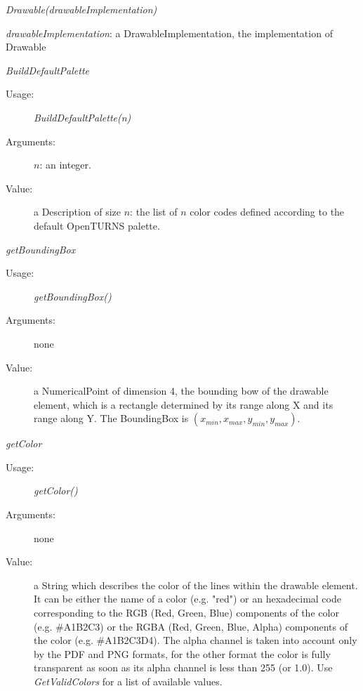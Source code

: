 \begin{description}
\item[Usage:] \textit{Drawable(drawableImplementation)}

\item[Arguments:] \textit{drawableImplementation}: a DrawableImplementation, the implementation of  Drawable

\item[Some methods:]  \rule{0pt}{1em}
  \begin{description}


  \item \textit{BuildDefaultPalette}
    \begin{description}
    \item[Usage:] \textit{BuildDefaultPalette(n)}
    \item[Arguments:] $n$: an integer.
    \item[Value:] a Description of size $n$: the list of $n$ color codes defined according to the default OpenTURNS palette.
    \end{description}
    \bigskip

  \item \textit{getBoundingBox}
    \begin{description}
    \item[Usage:] \textit{getBoundingBox()}
    \item[Arguments:] none
    \item[Value:] a NumericalPoint of dimension 4, the bounding bow of the drawable element, which is a rectangle determined by its range along X and its range along Y. The BoundingBox is $(x_{min}, x_{max}, y_{min}, y_{max})$.
    \end{description}
    \bigskip

  \item \textit{getColor}
    \begin{description}
    \item[Usage:] \textit{getColor()}
    \item[Arguments:] none
    \item[Value:] a String which describes the color of the lines within the drawable element. It can be either the name of a color (e.g. "red") or an hexadecimal code corresponding to the RGB (Red, Green, Blue) components of the color (e.g. \#A1B2C3) or the RGBA (Red, Green, Blue, Alpha) components of the color (e.g. \#A1B2C3D4). The alpha channel is taken into account only by the PDF and PNG formats, for the other format the color is fully transparent as soon as its alpha channel is less than 255 (or 1.0). Use \textit{GetValidColors} for a list of available values.
    \end{description}
    \bigskip



\end{description}
\end{description}
